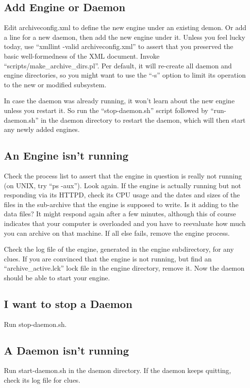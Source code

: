 \subsection{Add Engine or Daemon}
Edit archiveconfig.xml to define the new engine under an existing
demon. Or add a line for a new daemon, then add the new engine under
it.  Unless you feel lucky today, use ``xmllint -valid
archiveconfig.xml'' to assert that you preserved the basic
well-formedness of the XML document. Invoke
``scripts/make\_archive\_dirs.pl''. Per default, it will re-create all
daemon and engine directories, so you might want to use the ``-s''
option to limit its operation to the new or modified subsystem.

In case the daemon was already running, it won't learn about the new
engine unless you restart it. So run the ``stop-daemon.sh'' script
followed by ``run-daemon.sh'' in the daemon directory to restart
the daemon, which will then start any newly added engines.

\subsection{An Engine isn't running}
Check the process list to assert that the engine in question is really not
running (on UNIX, try ``ps -aux''). Look again. If the engine is
actually running but not responding via its HTTPD, check its CPU usage
and the dates and sizes of the files in the sub-archive that the
engine is supposed to write. Is it adding to the data files?
It might respond again after a few minutes, although
this of course indicates that your computer is overloaded and you have
to reevaluate how much you can archive on that machine.
If all else fails, remove the engine process.

Check the log file of the engine, generated in the engine
subdirectory, for any clues. If you are convinced that the engine is
not running, but find an ``archive\_active.lck'' lock file in the
engine directory, remove it. Now the daemon should be able to start
your engine.  

\subsection{I want to stop a Daemon}
Run stop-daemon.sh.

\subsection{A Daemon isn't running}
Run start-daemon.sh in the daemon directory. If the daemon keeps quitting,
check its log file for clues.

